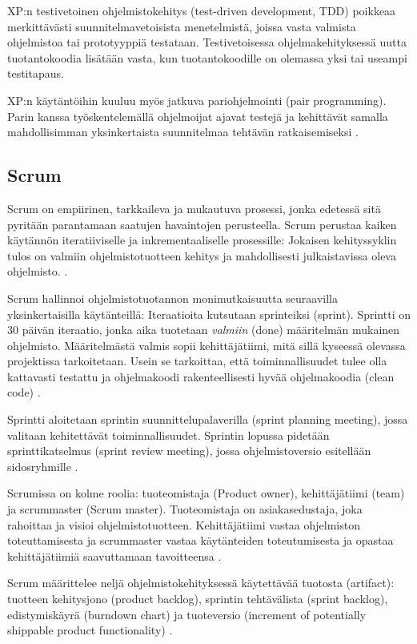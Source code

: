 \documentclass[finnish]{tktltiki2}
\theoremstyle{definition}
\theoremstyle{remark}
\begin{document}
XP:n testivetoinen ohjelmistokehitys (test-driven development, TDD) poikkeaa merkittävästi suunnitelmavetoisista menetelmistä, joissa vasta valmista ohjelmistoa tai prototyyppiä testataan. Testivetoisessa ohjelmakehityksessä uutta tuotantokoodia lisätään vasta, kun tuotantokoodille on olemassa yksi tai useampi testitapaus.

XP:n käytäntöihin kuuluu myös jatkuva pariohjelmointi (pair programming). Parin kanssa työskentelemällä ohjelmoijat ajavat testejä ja kehittävät samalla mahdollisimman yksinkertaista suunnitelmaa tehtävän ratkaisemiseksi \cite{BEC99}.

\subsection{Scrum}

Scrum on empiirinen, tarkkaileva ja mukautuva prosessi, jonka edetessä sitä pyritään parantamaan saatujen havaintojen perusteella. Scrum perustaa kaiken käytännön iteratiiviselle ja inkrementaaliselle prosessille: Jokaisen kehityssyklin tulos on valmiin ohjelmistotuotteen kehitys ja mahdollisesti julkaistavissa oleva ohjelmisto. \cite{SCH09}.

Scrum hallinnoi ohjelmistotuotannon monimutkaisuutta seuraavilla yksinkertaisilla käytänteillä: Iteraatioita kutsutaan sprinteiksi (sprint). Sprintti on 30 päivän iteraatio, jonka aika tuotetaan \textit{valmiin} (done) määritelmän mukainen ohjelmisto. Määritelmästä valmis sopii kehittäjätiimi, mitä sillä kyseessä olevassa projektissa tarkoitetaan. Usein se tarkoittaa, että toiminnallisuudet tulee olla kattavasti testattu ja ohjelmakoodi rakenteellisesti hyvää ohjelmakoodia (clean code) \cite{SCH09}. 

Sprintti aloitetaan sprintin suunnittelupalaverilla (sprint planning meeting), jossa valitaan kehitettävät toiminnallisuudet. Sprintin lopussa pidetään sprinttikatselmus (sprint review meeting), jossa ohjelmistoversio esitellään sidosryhmille \cite{SCH09}.

Scrumissa on kolme roolia: tuoteomistaja (Product owner), kehittäjätiimi (team) ja scrummaster (Scrum master). Tuoteomistaja on asiakasedustaja, joka rahoittaa ja visioi ohjelmistotuotteen. Kehittäjätiimi vastaa ohjelmiston toteuttamisesta ja scrummaster vastaa käytänteiden toteutumisesta ja opastaa kehittäjätiimiä saavuttamaan tavoitteensa \cite{SCH09}.

Scrum määrittelee neljä ohjelmistokehityksessä käytettävää tuotosta (artifact): tuotteen kehitysjono (product backlog), sprintin tehtävälista (sprint backlog), edistymiskäyrä (burndown chart) ja tuoteversio (increment of potentially shippable product functionality) \cite{SCH09}.
\end{document}
